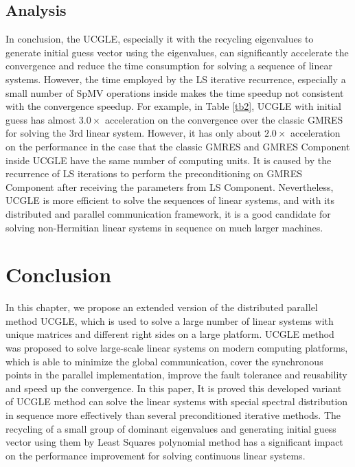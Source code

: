 \subsection{Analysis}

In conclusion, the UCGLE, especially it with the recycling eigenvalues to generate initial guess vector using the eigenvalues, can significantly accelerate the convergence and reduce the time consumption for solving a sequence of linear systems. However, the time employed by the LS iterative recurrence, especially a small number of SpMV operations inside makes the time speedup not consistent with the convergence speedup. For example, in Table \ref{tb2}, UCGLE with initial guess has almost $3.0 \times$ acceleration on the convergence over the classic GMRES for solving the 3rd linear system. However, it has only about $2.0 \times$ acceleration on the performance in the case that the classic GMRES and GMRES Component inside UCGLE have the same number of computing units. It is caused by the recurrence of LS iterations to perform the preconditioning on GMRES Component after receiving the parameters from LS Component. Nevertheless, UCGLE is more efficient to solve the sequences of linear systems, and with its distributed and parallel communication framework, it is a good candidate for solving non-Hermitian linear systems in sequence on much larger machines.

\section{Conclusion}

In this chapter, we propose an extended version of the distributed parallel method UCGLE, which is used to solve a large number of linear systems with unique matrices and different right sides on a large platform. UCGLE method was proposed to solve large-scale linear systems on modern computing platforms, which is able to minimize the global communication, cover the synchronous points in the parallel implementation, improve the fault tolerance and reusability and speed up the convergence. In this paper, It is proved this developed variant of UCGLE method can solve the linear systems with special spectral distribution in sequence more effectively than several preconditioned iterative methods. The recycling of a small group of dominant eigenvalues and generating initial guess vector using them by Least Squares polynomial method has a significant impact on the performance improvement for solving continuous linear systems.

\clearemptydoublepage